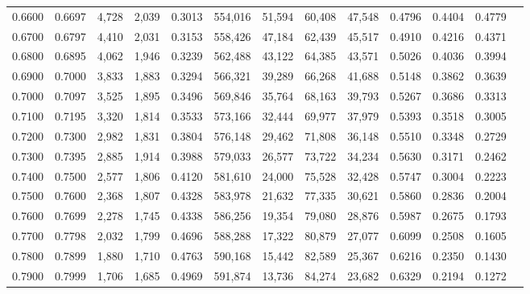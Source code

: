 \begin{tabular}{rrrrrrrrrrrrr}
0.6600 & 0.6697 &  4,728 & 2,039 &                                     0.3013 & 554,016 &  51,594 &  60,408 &  47,548 & 0.4796 & 0.4404 & 0.4779 \\
0.6700 & 0.6797 &  4,410 & 2,031 &                                     0.3153 & 558,426 &  47,184 &  62,439 &  45,517 & 0.4910 & 0.4216 & 0.4371 \\
0.6800 & 0.6895 &  4,062 & 1,946 &                                     0.3239 & 562,488 &  43,122 &  64,385 &  43,571 & 0.5026 & 0.4036 & 0.3994 \\
0.6900 & 0.7000 &  3,833 & 1,883 &                                     0.3294 & 566,321 &  39,289 &  66,268 &  41,688 & 0.5148 & 0.3862 & 0.3639 \\
0.7000 & 0.7097 &  3,525 & 1,895 &                                     0.3496 & 569,846 &  35,764 &  68,163 &  39,793 & 0.5267 & 0.3686 & 0.3313 \\
0.7100 & 0.7195 &  3,320 & 1,814 &                                     0.3533 & 573,166 &  32,444 &  69,977 &  37,979 & 0.5393 & 0.3518 & 0.3005 \\
0.7200 & 0.7300 &  2,982 & 1,831 &                                     0.3804 & 576,148 &  29,462 &  71,808 &  36,148 & 0.5510 & 0.3348 & 0.2729 \\
0.7300 & 0.7395 &  2,885 & 1,914 &                                     0.3988 & 579,033 &  26,577 &  73,722 &  34,234 & 0.5630 & 0.3171 & 0.2462 \\
0.7400 & 0.7500 &  2,577 & 1,806 &                                     0.4120 & 581,610 &  24,000 &  75,528 &  32,428 & 0.5747 & 0.3004 & 0.2223 \\
0.7500 & 0.7600 &  2,368 & 1,807 &                                     0.4328 & 583,978 &  21,632 &  77,335 &  30,621 & 0.5860 & 0.2836 & 0.2004 \\
0.7600 & 0.7699 &  2,278 & 1,745 &                                     0.4338 & 586,256 &  19,354 &  79,080 &  28,876 & 0.5987 & 0.2675 & 0.1793 \\
0.7700 & 0.7798 &  2,032 & 1,799 &                                     0.4696 & 588,288 &  17,322 &  80,879 &  27,077 & 0.6099 & 0.2508 & 0.1605 \\
0.7800 & 0.7899 &  1,880 & 1,710 &                                     0.4763 & 590,168 &  15,442 &  82,589 &  25,367 & 0.6216 & 0.2350 & 0.1430 \\
0.7900 & 0.7999 &  1,706 & 1,685 &                                     0.4969 & 591,874 &  13,736 &  84,274 &  23,682 & 0.6329 & 0.2194 & 0.1272 \\

\end{tabular}
